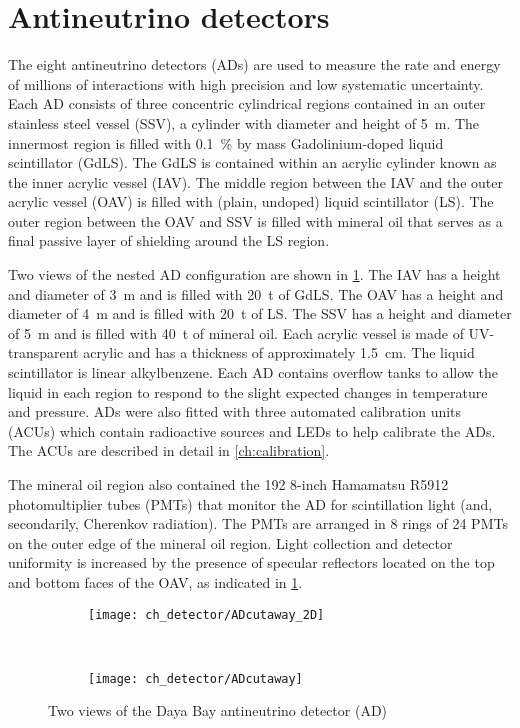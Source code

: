 \section{Antineutrino detectors}

The eight antineutrino detectors (ADs) are used to measure
the rate and energy of millions of \nuebar interactions with high precision
and low systematic uncertainty.
Each AD consists of three concentric cylindrical regions
contained in an outer stainless steel vessel (SSV),
a cylinder with diameter and height of \SI{5}{\m}.
The innermost region is filled with \SI{0.1}{\percent} by mass
Gadolinium-doped liquid scintillator (GdLS).
The GdLS is contained within an acrylic cylinder known as the inner acrylic vessel (IAV).
The middle region between the IAV and the outer acrylic vessel (OAV) is filled
with (plain, undoped) liquid scintillator (LS).
The outer region between the OAV and SSV is filled with mineral oil
that serves as a final passive layer of shielding around the LS region.

Two views of the nested AD configuration are shown in \cref{fig:ad_cutaway}.
The IAV has a height and diameter of \SI{3}{\m} and is filled with \SI{20}{\tonne}
of GdLS.
The OAV has a height and diameter of \SI{4}{\m} and is filled with \SI{20}{\tonne}
of LS.
The SSV has a height and diameter of \SI{5}{\m} and is filled with \SI{40}{\tonne}
of mineral oil.
Each acrylic vessel is made of UV-transparent acrylic
and has a thickness of approximately \SI{1.5}{\cm}.
The liquid scintillator is linear alkylbenzene.
Each AD contains overflow tanks to allow the liquid in each region
to respond to the slight expected changes in temperature and pressure.
ADs were also fitted with three automated calibration units (ACUs)
which contain radioactive sources and LEDs to help calibrate the ADs.
The ACUs are described in detail in \cref{ch:calibration}.

The mineral oil region also contained the 192 8-inch Hamamatsu R5912
photomultiplier tubes (PMTs) that monitor the AD for scintillation light
(and, secondarily, Cherenkov radiation).
The PMTs are arranged in 8 rings of 24 PMTs on the outer edge of the mineral oil region.
Light collection and detector uniformity is increased by the presence of
specular reflectors located on the top and bottom faces of the OAV,
as indicated in \cref{fig:ad_cutaway}.

\begin{figure}
    \centering
    \begin{subfigure}{\textwidth}
        \centering
        \texttt{[image: ch\_detector/ADcutaway\_2D]}
    \end{subfigure}
    \vspace{1cm}\\
    \begin{subfigure}[0.4\textheight]{\textwidth}
        \centering
        \texttt{[image: ch\_detector/ADcutaway]}
    \end{subfigure}
    \caption{Two views of the Daya Bay antineutrino detector (AD)}
    \label{fig:ad_cutaway}
\end{figure}



